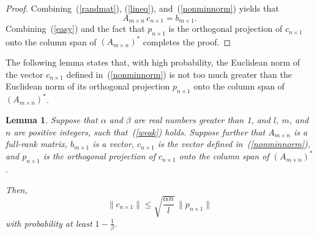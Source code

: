 \documentclass[letterpaper,12pt]{article}
\newtheorem{lemma}[theorem]{Lemma}
\begin{document}
\begin{proof}
Combining~(\ref{randmat}), (\ref{lineq}), and~(\ref{nonminnorm}) yields that
\begin{equation}
\label{easy}
A_{m \times n} \, c_{n \times 1} = b_{m \times 1}.
\end{equation}
Combining~(\ref{easy}) and the fact that $p_{n \times 1}$
is the orthogonal projection of $c_{n \times 1}$ onto the column span
of $(A_{m \times n})^*$ completes the proof.
\end{proof}


The following lemma states that, with high probability, the Euclidean norm
of the vector $c_{n \times 1}$ defined in~(\ref{nonminnorm})
is not too much greater than the Euclidean norm
of its orthogonal projection $p_{n \times 1}$ onto the column span
of $(A_{m \times n})^*$.

\begin{lemma}
\label{problemma}
Suppose that $\alpha$ and $\beta$ are real numbers greater than 1,
and $l$, $m$, and $n$ are positive integers, such that~(\ref{weak}) holds.
Suppose further that $A_{m \times n}$ is a full-rank matrix,
$b_{m \times 1}$ is a vector,
$c_{n \times 1}$ is the vector defined in~(\ref{nonminnorm}),
and $p_{n \times 1}$ is the orthogonal projection of $c_{n \times 1}$
onto the column span of $(A_{m \times n})^*$.

Then,
\begin{equation}
\label{energy}
\| c_{n \times 1} \| \le \sqrt{\frac{\alpha n}{l}} \, \| p_{n \times 1} \|
\end{equation}
with probability at least $1-\frac{1}{\beta}$.
\end{lemma}
\end{document}
